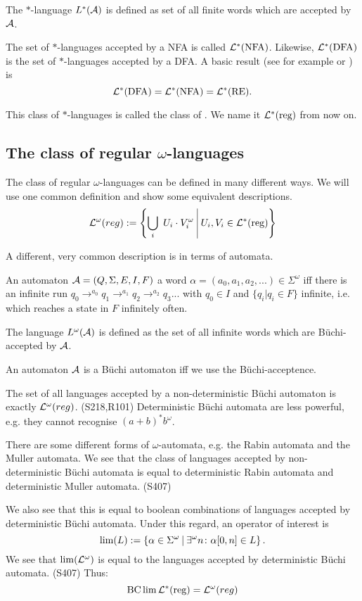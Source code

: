 The $*$-language $L^*(\mathcal{A})$ is defined as set of all finite words which are accepted by $\mathcal{A}$.

The set of $*$-languages accepted by a NFA is called $\mathcal{L}^*(\text{NFA})$. Likewise, $\mathcal{L}^*(\text{DFA})$ is the set of $*$-languages accepted by a DFA. A basic result (see for example \cite{FinAutLogR109} or \cite{InfWordsR110}) is
\[ \mathcal{L}^*(\text{DFA}) = \mathcal{L}^*(\text{NFA}) = \mathcal{L}^*(\text{RE}) . \]

This class of $*$-languages is called the class of . We name it $\mathcal{L}^*(\text{reg})$ from now on.

\subsection{The class of regular $\omega$-languages}
\label{reg-omega-lang}

The class of regular $\omega$-languages can be defined in many different ways. We will use one common definition and show some equivalent descriptions.
\[ \Lang^\omega(reg) := \Set{ \bigcup_i\ U_i \cdot V_i^\omega }{ U_i, V_i \in \Langreg } \]

A different, very common description is in terms of automata.

An automaton $\mathcal{A} = (Q, \Sigma, E, I, F)$  a word $\alpha = (a_0,a_1,a_2,...) \in \Sigma^\omega$ iff there is an infinite run $q_0 \rightarrow^{a_0} q_1 \rightarrow^{a_1} q_2 \rightarrow^{a_2} q_3 ...$ with $q_0 \in I$ and $\{ q_i | q_i \in F \}$ infinite, i.e. which reaches a state in $F$ infinitely often.

The language $L^\omega(\mathcal{A})$ is defined as the set of all infinite words which are Büchi-accepted by  $\mathcal{A}$.

An automaton $\mathcal{A}$ is a Büchi automaton iff we use the Büchi-acceptence.

The set of all languages accepted by a non-deterministic Büchi automaton is exactly $\mathcal{L}^\omega(reg)$. (S218,R101) Deterministic Büchi automata are less powerful, e.g. they cannot recognise $(a+b)^* b^\omega$.

There are some different forms of $\omega$-automata, e.g. the Rabin automata and the Muller automata. We see that the class of languages accepted by non-deterministic Büchi automata is equal to deterministic Rabin automata and deterministic Muller automata. (S407)

We also see that this is equal to boolean combinations of languages accepted by deterministic Büchi automata. Under this regard, an operator of interest is
\[ \lim(L) := \Set{ \alpha \in \Sigma^\omega }{ \existsinf n \colon \alpha[0,n] \in L } .\]
We see that $\lim(\mathcal{L}^\omega)$ is equal to the languages accepted by deterministic Büchi automata. (S407) Thus:
\[  \operatorname{BC} \lim \mathcal{L}^*(\text{reg}) = \mathcal{L}^\omega(reg) \]

